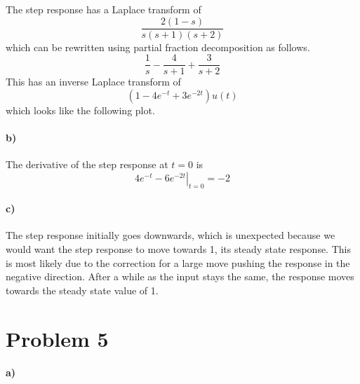 \documentclass[12pt]{article}
\begin{document}
The step response has a Laplace transform of
\[\frac{2(1-s)}{s(s+1)(s+2)}\]
which can be rewritten using partial fraction decomposition as follows.
\[\frac{1}{s}-\frac{4}{s+1} + \frac{3}{s+2}\]
This has an inverse Laplace transform of
\[(1-4e^{-t}+3e^{-2t})u(t)\]
which looks like the following plot.
\begin{center}
\end{center}

\paragraph{b)}

The derivative of the step response at \(t=0\) is
\[\left.4e^{-t}-6e^{-2t}\right|_{t=0}=-2\]

\paragraph{c)}

The step response initially goes downwards, which is unexpected because we would want
the step response to move towards 1, its steady state response. This is most likely
due to the correction for a large move pushing the response in the negative direction.
After a while as the input stays the same, the response moves towards the steady state
value of 1.

\section*{Problem 5}

\paragraph{a)}
\end{document}
